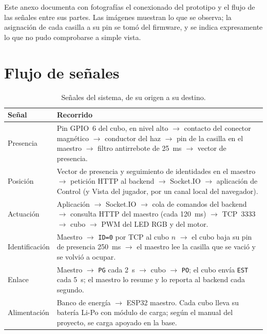 \documentclass{book}
\begin{document}
Este anexo documenta con fotografías el conexionado del prototipo y el flujo de las señales entre sus partes. Las imágenes muestran lo que se observa; la asignación de cada casilla a su pin se tomó del firmware, y se indica expresamente lo que no pudo comprobarse a simple vista.

\section{Flujo de señales}

\begin{table}[H]
\centering
\caption{Señales del sistema, de su origen a su destino.}
\label{tab:flujo-senales}
\renewcommand{\arraystretch}{1.3}
\begin{tabular}{|p{2.2cm}|p{8.6cm}|}
\hline
\textbf{Señal} & \textbf{Recorrido} \\
\hline
Presencia & Pin GPIO~6 del cubo, en nivel alto $\rightarrow$ contacto del conector magnético $\rightarrow$ conductor del haz $\rightarrow$ pin de la casilla en el maestro $\rightarrow$ filtro antirrebote de 25~ms $\rightarrow$ vector de presencia. \\
\hline
Posición & Vector de presencia y seguimiento de identidades en el maestro $\rightarrow$ petición HTTP al backend $\rightarrow$ Socket.IO $\rightarrow$ aplicación de Control (y Vista del jugador, por un canal local del navegador). \\
\hline
Actuación & Aplicación $\rightarrow$ Socket.IO $\rightarrow$ cola de comandos del backend $\rightarrow$ consulta HTTP del maestro (cada 120~ms) $\rightarrow$ TCP~3333 $\rightarrow$ cubo $\rightarrow$ PWM del LED RGB y del motor. \\
\hline
Identificación & Maestro $\rightarrow$ \texttt{ID=0} por TCP al cubo $n$ $\rightarrow$ el cubo baja su pin de presencia 250~ms $\rightarrow$ el maestro lee la casilla que se vació y se volvió a ocupar. \\
\hline
Enlace & Maestro $\rightarrow$ \texttt{PG} cada 2~s $\rightarrow$ cubo $\rightarrow$ \texttt{PO}; el cubo envía \texttt{EST} cada 5~s; el maestro lo resume y lo reporta al backend cada segundo. \\
\hline
Alimentación & Banco de energía $\rightarrow$ ESP32 maestro. Cada cubo lleva su batería Li-Po con módulo de carga; según el manual del proyecto, se carga apoyado en la base. \\
\hline
\end{tabular}
\end{table}
\end{document}
